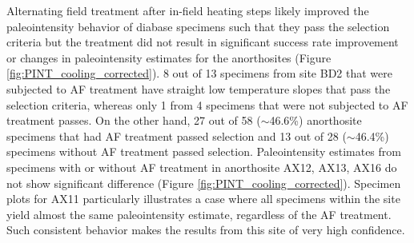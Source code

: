 \documentclass[draft]{agujournal2019}
\begin{document}
Alternating field treatment after in-field heating steps likely improved the paleointensity behavior of diabase specimens such that they pass the selection criteria but the treatment did not result in significant success rate improvement or changes in paleointensity estimates for the anorthosites (Figure \ref{fig:PINT_cooling_corrected}). 8 out of 13 specimens from site BD2 that were subjected to AF treatment have straight low temperature slopes that pass the selection criteria, whereas only 1 from 4 specimens that were not subjected to AF treatment passes. On the other hand, 27 out of 58 ($\sim$46.6\%) anorthosite specimens that had AF treatment passed selection and 13 out of 28 ($\sim$46.4\%) specimens without AF treatment passed selection. Paleointensity estimates from specimens with or without AF treatment in anorthosite AX12, AX13, AX16 do not show significant difference (Figure \ref{fig:PINT_cooling_corrected}). Specimen plots for AX11 particularly illustrates a case where all specimens within the site yield almost the same paleointensity estimate, regardless of the AF treatment. Such consistent behavior makes the results from this site of very high confidence. 
\end{document}
